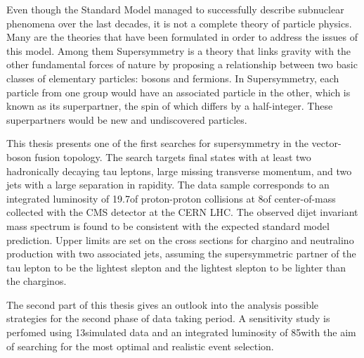 Even though the Standard Model managed to successfully describe subnuclear phenomena over the last decades, it is not a complete theory of particle physics. Many are the theories that have been formulated in order to address the issues of this model. Among them Supersymmetry is a theory that links gravity with the other fundamental forces of nature by proposing a relationship between two basic classes of elementary particles: bosons and fermions. In Supersymmetry, each particle from one group would have an associated particle in the other, which is known as its superpartner, the spin of which differs by a half-integer. These superpartners would be new and undiscovered particles.

This thesis presents one of the first searches for supersymmetry in the vector-boson fusion topology. The search targets final states with at least two hadronically decaying tau leptons, large missing transverse momentum, and two jets with a large separation in rapidity. The data sample corresponds to an integrated luminosity of 19.7\invfb of proton-proton collisions at 8\tev of center-of-mass collected with the CMS detector at the CERN LHC. The observed dijet invariant mass spectrum is found to be consistent with the expected standard model prediction. Upper limits are set on the cross sections for chargino and neutralino production with two associated jets, assuming the supersymmetric partner of the tau lepton to be the lightest slepton and the lightest slepton to be lighter than the charginos.

The second part of this thesis gives an outlook into the analysis possible strategies for the second phase of data taking period. A sensitivity study is perfomed using 13\tev simulated data and an integrated luminosity of 85\invfb with the aim of searching for the most optimal and realistic event selection.
